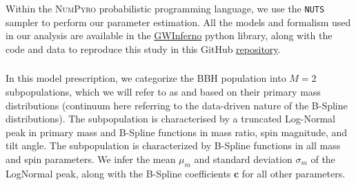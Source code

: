Within the \textsc{NumPyro} \citep{1810.09538,1912.11554} probabilistic programming language, we use the \texttt{NUTS} \citep{1111.4246} sampler to perform our parameter estimation. All the models and formalism used in our analysis are available in the \href{https://github.com/FarrOutLab/GWInferno}{GWInferno} python library, along with the code and data to reproduce this study in this GitHub \href{https://github.com/jaxeng/CosmicCousins}{repository}. 

\subsubsection{\base{}}
In this model prescription, we categorize the BBH population into $M=2$ subpopulations, which we will refer to as \first{} and \contB{} based on their primary mass distributions (continuum here referring to the data-driven nature of the B-Spline distributions). The \first{} subpopulation is characterised by a truncated Log-Normal peak in primary mass and B-Spline functions in mass ratio, spin magnitude, and tilt angle. The \contB{} subpopulation is characterized by B-Spline functions in all mass and spin parameters. We infer the mean $\mu_m$ and standard deviation $\sigma_m$ of the LogNormal peak, along with the B-Spline coefficients $\mathbf{c}$ for all other parameters.

